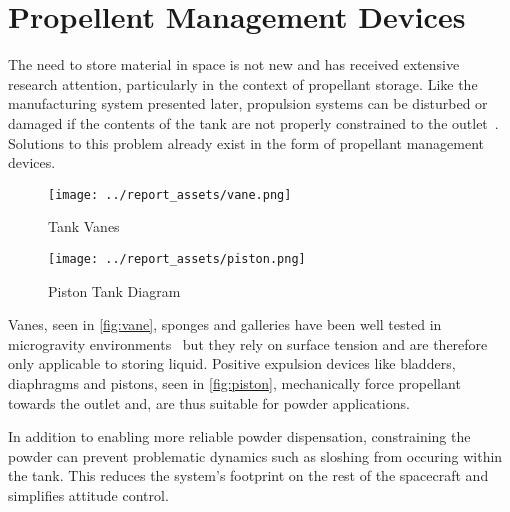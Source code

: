 \section{Propellent Management Devices}
The need to store material in space is not new and has received extensive research attention, particularly in the context of propellant storage. Like the manufacturing system presented later, propulsion systems can be disturbed or damaged if the contents of the tank are not properly constrained to the outlet~\cite{Hartwig2016}. Solutions to this problem already exist in the form of propellant management devices.
\begin{figure}[htbp]
    \centering
    
    \begin{minipage}{0.25\textwidth}
        \centering
        \texttt{[image: ../report\_assets/vane.png]}
        \caption{Tank Vanes~\cite{Hartwig2016}}\label{fig:vane}
    \end{minipage}
    \hspace{3em}
    \begin{minipage}{0.47\textwidth}
        \centering
        \texttt{[image: ../report\_assets/piston.png]}
        \caption{Piston Tank Diagram~\cite{TANG2023118406}}\label{fig:piston}
    \end{minipage}
    
\end{figure}
Vanes, seen in \autoref{fig:vane}, sponges and galleries have been well tested in microgravity environments~\cite{Hartwig2016} but they rely on surface tension and are therefore only applicable to storing liquid. Positive expulsion devices like bladders, diaphragms and pistons, seen in \autoref{fig:piston}, mechanically force propellant towards the outlet and, are thus suitable for powder applications. 

In addition to enabling more reliable powder dispensation, constraining the powder can prevent problematic dynamics such as sloshing from occuring within the tank. This reduces the system's footprint on the rest of the spacecraft and simplifies attitude control.


